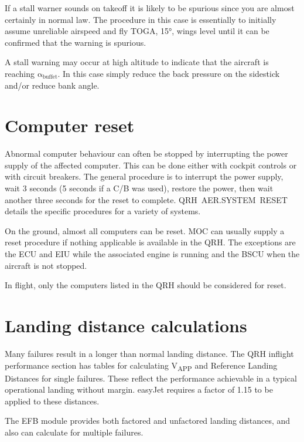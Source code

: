 \documentclass[a5paper,11pt,twoside]{book}
\newcommand{\multicite}[1]{
  \nopagebreak
  \noindent{\footnotesize\color{blue}{[ #1 ]}}
}
\newcommand{\V}[1]{V\textsubscript{#1}}
\begin{document}
If a stall warner sounds on takeoff it is likely to be spurious since you are
almost certainly in normal law. The procedure in this case is essentially to
initially assume unreliable airspeed and fly TOGA, 15°, wings level until it can
be confirmed that the warning is spurious.

A stall warning may occur at high altitude to indicate that the aircraft is
reaching $\mathrm{\alpha_{buffet}}$. In this case simply reduce the back
pressure on the sidestick and/or reduce bank angle.

\multicite{FCOM PRO.AER.MISC}


\section{Computer reset}

Abnormal computer behaviour can often be stopped by interrupting the power
supply of the affected computer. This can be done either with cockpit controls
or with circuit breakers. The general procedure is to interrupt the power
supply, wait 3 seconds (5 seconds if a C/B was used), restore the power, then
wait another three seconds for the reset to complete. QRH AER.SYSTEM RESET
details the specific procedures for a variety of systems.

On the ground, almost all computers can be reset. MOC can usually supply a reset
procedure if nothing applicable is available in the QRH. The exceptions are the
ECU and EIU while the associated engine is running and the BSCU when the
aircraft is not stopped.

In flight, only the computers listed in the QRH should be considered for reset.

\multicite{QRH AER.SYSTEM RESET}

\section{Landing distance calculations}

Many failures result in a longer than normal landing distance. The QRH inflight
performance section has tables for calculating \V{APP} and Reference Landing
Distances for single failures. These reflect the performance achievable in a
typical operational landing without margin. easyJet requires a factor of 1.15 to
be applied to these distances.

The EFB module provides both factored and unfactored landing distances, and also
can calculate for multiple failures.
\end{document}
